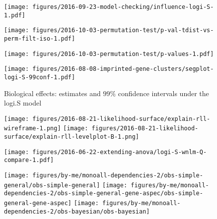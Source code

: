 \documentclass[letterpaper]{article}
\begin{document}
\begin{figure}
\begin{center}
\texttt{[image: figures/2016-09-23-model-checking/influence-logi-S-1.pdf]}
\end{center}
\caption{}
\label{fig:influence-logi.S}
\end{figure}

\begin{figure}
\begin{center}
\texttt{[image: figures/2016-10-03-permutation-test/p-val-tdist-vs-perm-filt-iso-1.pdf]}
\end{center}
\caption{}
\label{fig:pval-tdist-vs-perm}
\end{figure}

\begin{figure}
\begin{center}
\texttt{[image: figures/2016-10-03-permutation-test/p-values-1.pdf]}
\end{center}
\caption{}
\label{fig:pval}
\end{figure}

\begin{figure}
\begin{center}
\texttt{[image: figures/2016-08-08-imprinted-gene-clusters/segplot-logi-S-99conf-1.pdf]}
\end{center}
\caption{Biological effects: estimates and $99\%$ confidence intervals under
the logi.S model}
\label{fig:biol-effects-logi.S}
\end{figure}

\begin{figure}
\begin{center}
\texttt{[image: figures/2016-08-21-likelihood-surface/explain-rll-wireframe-1.png]}
\texttt{[image: figures/2016-08-21-likelihood-surface/explain-rll-levelplot-B-1.png]}
\end{center}
\caption{}
\label{fig:ll-surf-explain}
\end{figure}

\begin{figure}
\begin{center}
\texttt{[image: figures/2016-06-22-extending-anova/logi-S-wnlm-Q-compare-1.pdf]}
\end{center}
\caption{}
\label{fig:logi.S-wnlm.Q-compare}
\end{figure}

\begin{figure}
\begin{center}
\texttt{[image: figures/by-me/monoall-dependencies-2/obs-simple-general/obs-simple-general]}
\hspace{\fill}
\texttt{[image: figures/by-me/monoall-dependencies-2/obs-simple-general-gene-aspec/obs-simple-general-gene-aspec]}
\hspace{\fill}
\texttt{[image: figures/by-me/monoall-dependencies-2/obs-bayesian/obs-bayesian]}
\end{center}
\caption{}
\label{fig:glm-vs-hierarch}
\end{figure}
\end{document}
